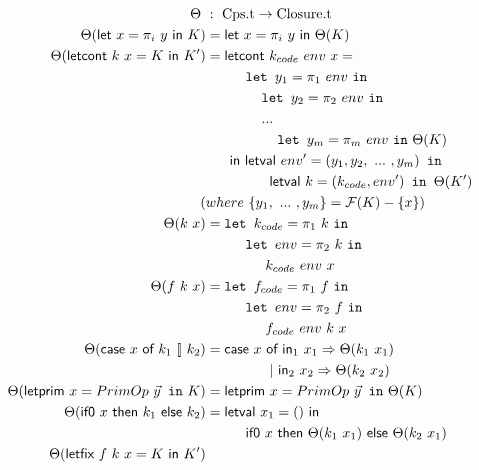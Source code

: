 \documentclass{article}
\theoremstyle{definition}
\theoremstyle{remark}
\numberwithin{equation}{section}
\begin{document}
\begin{figure}[!ht]
  \centering
\begin{align*}
\Theta\ &:\ \textrm{Cps.t} \to \textrm{Closure.t}\\     %
\Theta(\textsf{let }x=\pi _i\ y\textsf{ in }K)
    &=\textsf{let }x=\pi _i\ y\textsf{ in }\Theta(K)\\   %
\Theta(\textsf{letcont }k\ x=K\textsf{ in }K')
    &=\textsf{letcont }k_{code}\ env\ x=\\
    &\kern1cm   \texttt{let }y_1=\pi _1\ env\ \texttt{in}\\
    &\kern1.4cm   \texttt{let }y_2=\pi _2\ env\ \texttt{in}\\
    &\kern1.4cm   ...\\
    &\kern1.8cm   \texttt{let }y_m=\pi _m\ env\ \texttt{in}\ \Theta(K)\\
    &\kern0.6cm\textsf{in letval }env'=(y_1, y_2, \ ...\ ,y_m)\texttt{ in}\\
    &\kern1.6cm\textsf{letval }k=(k_{code}, env')\texttt{ in }\Theta(K')\\ %
    (&where\ \{y_1,\ ...\ ,y_m\}=\mathcal{F}(K)-\{x\})\\
\Theta(k\ x)
    &=\texttt{let }k_{code}=\pi _1\ k\ \texttt{in}\\
    &\kern1cm   \texttt{let }env=\pi _2\ k\ \texttt{in}\\
    &\kern1.5cm  k_{code}\ env\ x\\   %
\Theta(f\ k\ x)
    &=\texttt{let }f_{code}=\pi _1\ f\ \texttt{in}\\
    &\kern1cm   \texttt{let }env=\pi _2\ f\ \texttt{in}\\
    &\kern1.5cm  f_{code}\ env\ k \ x\\   %
\Theta(\textsf{case }x\textsf{ of }k_1\ [\!]\ k_2)
    &=\textsf{case }x\textsf{ of in}_1\ x_1\Rightarrow \Theta(k_1\ x_1)\\
    &\kern1.6cm  |\ \textsf{in}_2\ x_2\Rightarrow \Theta(k_2\ x_2)\\   %
\Theta(\textsf{letprim }x=PrimOp\ \vec{y}\texttt{ in}\ K)
    &=\textsf{letprim }x=PrimOp\ \vec{y}\texttt{ in}\ \Theta(K)\\   %
\Theta(\textsf{if0 }x\textsf{ then }k_1\ \textsf{else }k_2)
    &=\textsf{letval }x_1=()\textsf{ in}\\
    &\kern1cm \textsf{if0 }x\textsf{ then }\Theta(k_1\ x_1)
    \ \textsf{else }\Theta(k_2\ x_1)\\
\Theta(\textsf{letfix }f\ k\ x=K\textsf{ in }K')   %

\end{align*}
\end{figure}
\end{document}
